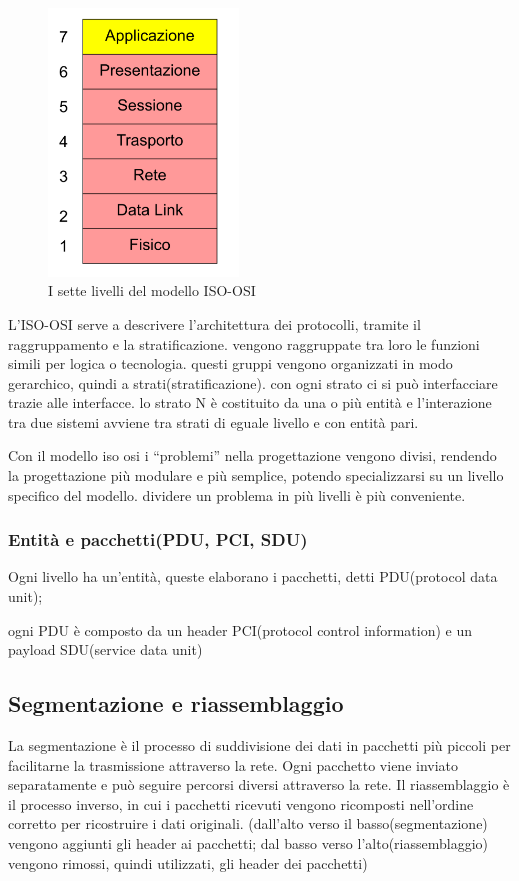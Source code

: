 \begin{figure}[h!]
    \centering
    \includegraphics[width=0.45\textwidth]{images/ISO_OSI_livelli.png}
    \caption{I sette livelli del modello ISO-OSI}
    \label{fig:iso_osi_livelli}
\end{figure}

L'ISO-OSI serve a descrivere l'architettura dei protocolli, tramite il raggruppamento e la stratificazione.
vengono raggruppate tra loro le funzioni simili per logica o tecnologia.
questi gruppi vengono organizzati in modo gerarchico, quindi a strati(stratificazione). con ogni strato ci si può interfacciare trazie alle interfacce.
lo strato N è costituito da una o più entità e l'interazione tra due sistemi avviene tra strati di eguale livello e con entità pari.

Con il modello iso osi i “problemi” nella progettazione vengono divisi, rendendo la progettazione più modulare e più semplice, potendo specializzarsi su un livello specifico del modello. dividere un problema in più livelli è più conveniente. 
\subsubsection{Entità e pacchetti(PDU, PCI, SDU)}
Ogni livello ha un'entità, queste elaborano i pacchetti, detti PDU(protocol data unit);

ogni PDU è composto da un header PCI(protocol control information) e un payload SDU(service data unit) 
\subsection{Segmentazione e riassemblaggio} 
La segmentazione è il processo di suddivisione dei dati in pacchetti più piccoli per facilitarne la trasmissione attraverso la rete. Ogni pacchetto viene inviato separatamente e può seguire percorsi diversi attraverso la rete. Il riassemblaggio è il processo inverso, in cui i pacchetti ricevuti vengono ricomposti nell'ordine corretto per ricostruire i dati originali.
(dall’alto verso il basso(segmentazione) vengono aggiunti gli header ai pacchetti; dal basso verso l’alto(riassemblaggio) vengono rimossi, quindi utilizzati, gli header dei pacchetti)
